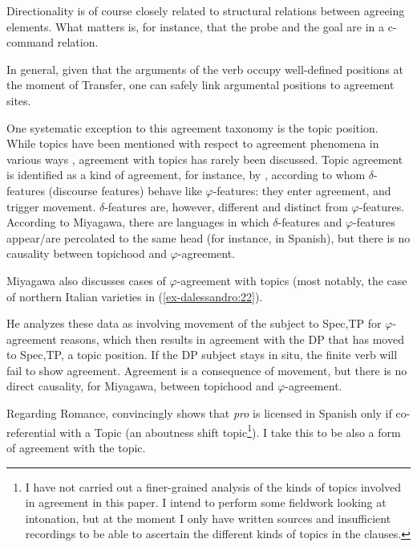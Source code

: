 \documentclass[output=paper
,modfonts
,nonflat]{langsci/langscibook}
\begin{document}
Directionality is of course closely related to structural relations between agreeing elements. What matters is, for instance, that the probe and the goal are in a c-command relation.

In general, given that the arguments of the verb occupy well-defined positions at the moment of Transfer, one can safely link argumental positions to agreement sites.

One systematic exception to this agreement taxonomy is the topic position. While topics have been mentioned with respect to agreement phenomena in various ways \citep{Bresnan_Mchombo1987, Lambrecht1981}, agreement with topics has rarely been discussed. Topic agreement is identified as a kind of agreement, for instance, by \citet{Miyagawa2017}, according to whom $\delta $-features (discourse features) behave like $\varphi $-features: they enter agreement, and trigger movement. $\delta $-features are, however, different and distinct from $\varphi $-features. According to Miyagawa, there are languages in which $\delta $-features and $\varphi $-features appear/are percolated to the same head (for instance, in Spanish), but there is no causality between topichood and $\varphi $-agreement. 

Miyagawa also discusses cases of $\varphi $-agreement with topics (most notably, the case of northern Italian varieties in (\ref{ex-dalessandro:22}).

He analyzes these data as involving movement of the subject to Spec,TP for $\varphi $-agreement reasons, which then results in agreement with the DP that has moved to Spec,TP, a topic position. If the DP subject stays in situ, the finite verb will fail to show agreement. Agreement is a consequence of movement, but there is no direct causality, for Miyagawa, between topichood and $\varphi $-agreement.

Regarding Romance, \citet{Jimenez_Fernandez2016} convincingly shows that \textit{pro} is licensed in Spanish only if co-referential with a Topic (an aboutness shift topic\footnote{
I have not carried out a finer-grained analysis of the kinds of topics involved in agreement in this paper. I intend to perform some fieldwork looking at intonation, but at the moment I only have written sources and insufficient recordings to be able to ascertain the different kinds of topics in the clauses.}). I take this to be also a form of agreement with the topic. 
\end{document}
